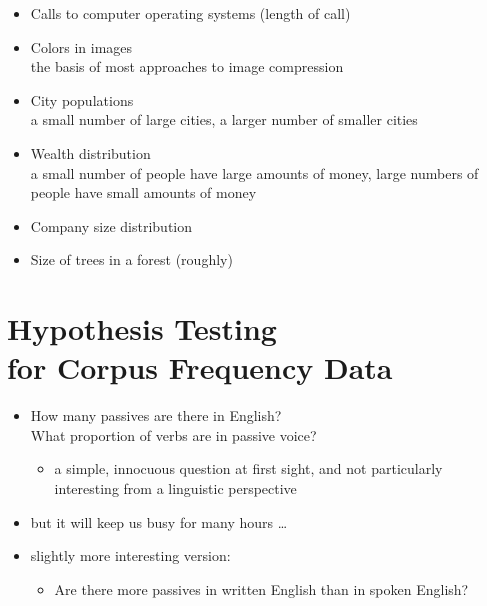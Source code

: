 \documentclass[a4paper,landscape,headrule,footrule,dvips]{foils}
\begin{document}
\begin{CJK}{UTF8}{min}

\begin{itemize}
\item Calls to computer operating systems (length of call)
\item Colors in images
    \\ the basis of most approaches to image compression
  \item City populations 
\\ a small number of large cities, a larger number of smaller cities
\item Wealth distribution 
\\ a small number of people have large amounts of money, large numbers of people have small amounts of money
\item  Company size distribution
\item Size of trees in a forest (roughly)
\end{itemize}
  

\section{Hypothesis Testing \\ for Corpus Frequency Data}

\begin{itemize}
\item How many passives are there in English?
  \\ What proportion of verbs are in passive voice?
\begin{itemize}
\item a simple, innocuous question at first sight, and not
particularly interesting from a linguistic perspective
\end{itemize}
\item but it will keep us busy for many hours …
\item slightly more interesting version:
  \begin{itemize}
  \item Are there more passives in written English
than in spoken English?
\end{itemize}
\end{itemize}


\end{CJK}
\end{document}
